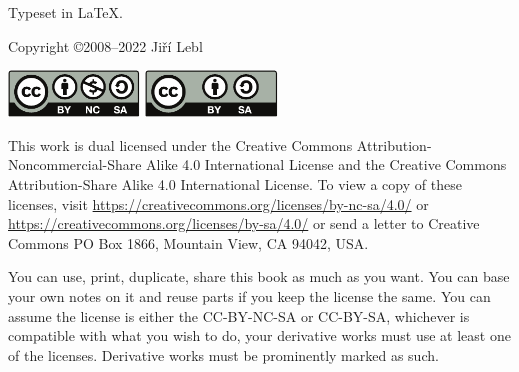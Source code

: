 \documentclass[12pt]{book}
\begin{document}

\newcommand{\theversion}{6.3}
\makediffytitlepage

\newpage

\vspace*{\fill}

\begin{small}
\noindent
Typeset in \LaTeX.

\bigskip

\noindent
Copyright \copyright 2008--2022 Ji\v{r}\'i Lebl



\bigskip

\noindent
\includegraphics[width=1.38in]{figures/license}
\quad
\includegraphics[width=1.38in]{figures/license2}

\bigskip

\noindent
This work
is dual licensed under
the Creative Commons
Attribution-Non\-commercial-Share Alike 4.0 International License and
the Creative Commons
Attribution-Share Alike 4.0 International License.
To view a
copy of these licenses, visit
\url{https://creativecommons.org/licenses/by-nc-sa/4.0/}
or
\url{https://creativecommons.org/licenses/by-sa/4.0/}
or send a letter to
Creative Commons
PO Box 1866, Mountain View, CA 94042, USA\@.

\bigskip

\noindent
You can use, print, duplicate, share this book as much as you want.  You can
base your own notes on it and reuse parts if you keep the license the
same.  You can assume the license is either the
CC-BY-NC-SA or CC-BY-SA\@,
whichever is compatible with what you wish to do, your derivative works must
use at least one of the licenses.
Derivative works must be prominently marked as such.


\end{small}
\end{document}
